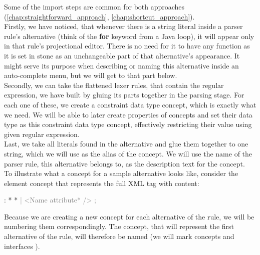 Some of the import steps are common for both approaches (\ref{chap:straightforward_approach}, \ref{chap:shortcut_approach}).
\\

Firstly, we have noticed, that whenever there is a string literal inside a parser rule's alternative (think of the \textbf{for} keyword from a Java loop), it will appear only in that rule's projectional editor.
There is no need for it to have any function as it is set in stone as an unchangeable part of that alternative's appearance.
It might serve its purpose when describing or naming this alternative inside an auto-complete menu, but we will get to that part below.
\\

Secondly, we can take the flattened lexer rules, that contain the regular expression, we have built by gluing its parts together in the parsing stage.
For each one of these, we create a constraint data type concept, which is exactly what we need.
We will be able to later create properties of concepts and set their data type as this constraint data type concept, effectively restricting their value using given regular expression.
\\

Last, we take all literals found in the alternative and glue them together to one string, which we will use as the alias of the concept.
We will use the name of the parser rule, this alternative belongs to, as the description text for the concept.
\\

To illustrate what a concept for a sample alternative looks like, consider the element concept that represents the full XML tag with content:

\begin{antlr}
	      :   \literal{<}  * \literal{>} * \literal{</}  \literal{>}
             \textcolor{gray}{|   \ap<\ap Name attribute* \ap/>\ap}
             \textcolor{gray}{;}
\end{antlr}

Because we are creating a new concept for each alternative of the rule, we will be numbering them correspondingly.
The concept, that will represent the first alternative of the  rule, will therefore be named 
(we will mark concepts  and interfaces ).

